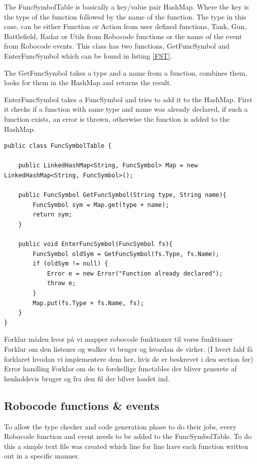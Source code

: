The FuncSymbolTable is basically a key/value pair HashMap. Where the key is the type of the function followed by the name of the function. The type in this case, can be either Function or Action from user defined functions, Tank, Gun, Battlefield, Radar or Utils from Robocode functions or the name of the event from Robocode events.
This class has two functions, GetFuncSymbol and EnterFuncSymbol which can be found in listing \ref{FST}. 

The GetFuncSymbol takes a type and a name from a function, combines them, looks for them in the HashMap and returns the result.

EnterFuncSymbol takes a FuncSymbol and tries to add it to the HashMap. First it checks if a function with same type and name was already declared, if such a function exists, an error is thrown, otherwise the function is added to the HashMap.

\begin{lstlisting}[caption={FuncSymbolTable}, label={FST}]
public class FuncSymbolTable {

	public LinkedHashMap<String, FuncSymbol> Map = new LinkedHashMap<String, FuncSymbol>();

	public FuncSymbol GetFuncSymbol(String type, String name){
    	FuncSymbol sym = Map.get(type + name);
    	return sym;
	}

	public void EnterFuncSymbol(FuncSymbol fs){
    	FuncSymbol oldSym = GetFuncSymbol(fs.Type, fs.Name);
    	if (oldSym != null) {
        	Error e = new Error("Function already declared");
        	throw e;
    	}
    	Map.put(fs.Type + fs.Name, fs);
	}
}
\end{lstlisting}

Forklar måden hvor på vi mapper robocode funktioner til vores funktioner
Forklar om den listener og walker vi bruger og hvordan de virker. (I hvert fald  få forklaret hvodan vi implementere dem her, hvis de er beskrevet  i den section før)
Error handling
Forklar om de to forskellige functables der bliver generete af henholdsvis bruger og fra den fil der bilver loadet ind. 

\subsection{Robocode functions \& events}
To allow the type checker and code generation phase to do their jobs, every Robocode function and event needs to be added to the FuncSymbolTable. To do this a simple text file was created which line for line have each function written out in a specific manner. 

